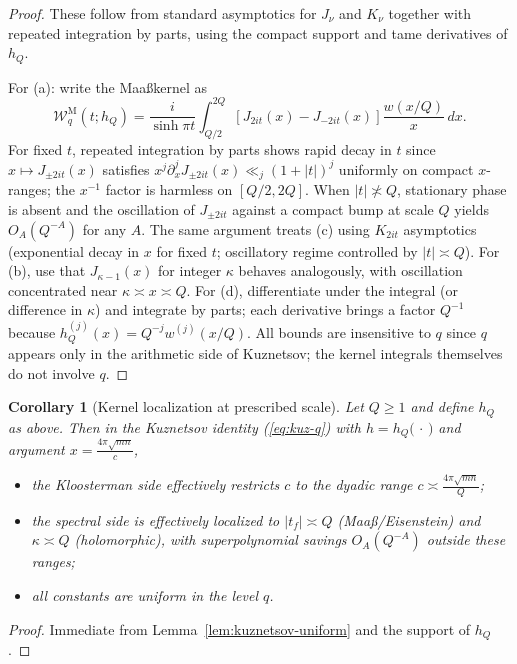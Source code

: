 \documentclass[11pt]{article}
\def\eqref#1{(\ref{#1})}%
\newtheorem{corollary}[lemma]{Corollary}
\theoremstyle{definition}
\theoremstyle{remark}
\numberwithin{equation}{part}
\begin{document}
\begin{proof}
	These follow from standard asymptotics for $J_\nu$ and $K_\nu$ together with repeated integration by parts, using the compact support and tame derivatives of $h_Q$.

	For (a): write the Maa\ss kernel as
	\[
		\mathcal W_q^{\mathrm{M}}(t;h_Q)=\frac{i}{\sinh\pi t}\int_{Q/2}^{2Q}\!\left[J_{2it}(x)-J_{-2it}(x)\right]\frac{w(x/Q)}{x}\,dx.
	\]
	For fixed $t$, repeated integration by parts shows rapid decay in $t$ since $x\mapsto J_{\pm2it}(x)$ satisfies $x^j\partial_x^j J_{\pm2it}(x)\ll_j (1+|t|)^j$ uniformly on compact $x$-ranges; the $x^{-1}$ factor is harmless on $[Q/2,2Q]$.
	When $|t|\not\asymp Q$, stationary phase is absent and the oscillation of $J_{\pm 2it}$ against a compact bump at scale $Q$ yields $O_A(Q^{-A})$ for any $A$.
	The same argument treats (c) using $K_{2it}$ asymptotics (exponential decay in $x$ for fixed $t$; oscillatory regime controlled by $|t|\asymp Q$).
	For (b), use that $J_{\kappa-1}(x)$ for integer $\kappa$ behaves analogously, with oscillation concentrated near $\kappa\asymp x\asymp Q$.
	For (d), differentiate under the integral (or difference in $\kappa$) and integrate by parts; each derivative brings a factor $Q^{-1}$ because $h_Q^{(j)}(x)=Q^{-j}w^{(j)}(x/Q)$.
	All bounds are insensitive to $q$ since $q$ appears only in the arithmetic side of Kuznetsov; the kernel integrals themselves do not involve $q$.
\end{proof}

\begin{corollary}[Kernel localization at prescribed scale]\label{cor:kernel-localization}
	Let $Q\ge1$ and define $h_Q$ as above. Then in the Kuznetsov identity \eqref{eq:kuz-q} with $h=h_Q\big(\,\cdot\,\big)$ and argument $x=\tfrac{4\pi\sqrt{mn}}{c}$,
	\begin{itemize}[leftmargin=2em]
		\item the Kloosterman side effectively restricts $c$ to the dyadic range $c\asymp \tfrac{4\pi\sqrt{mn}}{Q}$;
		\item the spectral side is effectively localized to $|t_f|\asymp Q$ (Maa\ss/Eisenstein) and $\kappa\asymp Q$ (holomorphic), with superpolynomial savings $O_A(Q^{-A})$ outside these ranges;
		\item all constants are uniform in the level $q$.
	\end{itemize}
\end{corollary}

\begin{proof}
	Immediate from Lemma~\ref{lem:kuznetsov-uniform} and the support of $h_Q$.
\end{proof}
\end{document}
